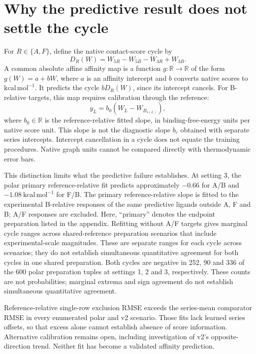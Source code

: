 \documentclass{article}
\begin{document}
\section{Why the predictive result does not settle the cycle}

For \(R\in\{A,F\}\), define the native contact-score cycle by
\[
 D_R(W)=W_{5R}-W_{5B}-W_{3R}+W_{3B}.
\]
A common absolute affine affinity map is a function \(g:\mathbb R\to\mathbb R\) of the form \(g(W)=a+bW\), where \(a\) is an affinity intercept and \(b\) converts native scores to \(\mathrm{kcal\,mol^{-1}}\). It predicts the cycle \(bD_R(W)\), since its intercept cancels. For B-relative targets, this map requires calibration through the reference:
\[
 y_L=b_0(W_L-W_{B_{s(L)}}),
\]
where \(b_0\in\mathbb R\) is the reference-relative fitted slope, in binding-free-energy units per native score unit. This slope is not the diagnostic slope \(b_c\) obtained with separate series intercepts. Intercept cancellation in a cycle does not equate the training procedures. Native graph units cannot be compared directly with thermodynamic error bars.

This distinction limits what the predictive failure establishes. At setting 3, the polar primary reference-relative fit predicts approximately \(-0.66\) for A/B and \(-1.08\ \mathrm{kcal\,mol^{-1}}\) for F/B. The primary reference-relative slope is fitted to the experimental B-relative responses of the same predictive ligands outside A, F and B; A/F responses are excluded. Here, ``primary'' denotes the endpoint preparation listed in the appendix. Refitting without A/F targets gives marginal cycle ranges across shared-reference preparation scenarios that include experimental-scale magnitudes. These are separate ranges for each cycle across scenarios; they do not establish simultaneous quantitative agreement for both cycles in one shared preparation. Both cycles are negative in 252, 90 and 336 of the 600 polar preparation tuples at settings 1, 2 and 3, respectively. These counts are not probabilities; marginal extrema and sign agreement do not establish simultaneous quantitative agreement.

Reference-relative single-row exclusion RMSE exceeds the series-mean comparator RMSE in every enumerated polar and v2 scenario. Those fits lack learned series offsets, so that excess alone cannot establish absence of score information. Alternative calibration remains open, including investigation of v2's opposite-direction trend. Neither fit has become a validated affinity prediction.
\end{document}
